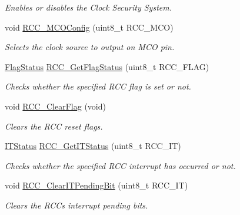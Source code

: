 \begin{DoxyCompactItemize}
\begin{DoxyCompactList}\small\item\em Enables or disables the Clock Security System. \end{DoxyCompactList}\item 
void \mbox{\hyperlink{group___r_c_c___exported___functions_ga8f62b86c6ca8ae6585ba1cec79431fe5}{R\+C\+C\+\_\+\+M\+C\+O\+Config}} (uint8\+\_\+t R\+C\+C\+\_\+\+M\+CO)
\begin{DoxyCompactList}\small\item\em Selects the clock source to output on M\+CO pin. \end{DoxyCompactList}\item 
\mbox{\hyperlink{group___exported__types_ga89136caac2e14c55151f527ac02daaff}{Flag\+Status}} \mbox{\hyperlink{group___r_c_c___exported___functions_ga2897bdc52f272031c44fb1f72205d295}{R\+C\+C\+\_\+\+Get\+Flag\+Status}} (uint8\+\_\+t R\+C\+C\+\_\+\+F\+L\+AG)
\begin{DoxyCompactList}\small\item\em Checks whether the specified R\+CC flag is set or not. \end{DoxyCompactList}\item 
void \mbox{\hyperlink{group___r_c_c___exported___functions_ga53f909dbb15a54124419084ebda97d72}{R\+C\+C\+\_\+\+Clear\+Flag}} (void)
\begin{DoxyCompactList}\small\item\em Clears the R\+CC reset flags. \end{DoxyCompactList}\item 
\mbox{\hyperlink{group___exported__types_gaacbd7ed539db0aacd973a0f6eca34074}{I\+T\+Status}} \mbox{\hyperlink{group___r_c_c___exported___functions_ga6126c99f398ee4be410ad76ae3aee18f}{R\+C\+C\+\_\+\+Get\+I\+T\+Status}} (uint8\+\_\+t R\+C\+C\+\_\+\+IT)
\begin{DoxyCompactList}\small\item\em Checks whether the specified R\+CC interrupt has occurred or not. \end{DoxyCompactList}\item 
void \mbox{\hyperlink{group___r_c_c___exported___functions_ga529842d165910f8f87e26115da36089b}{R\+C\+C\+\_\+\+Clear\+I\+T\+Pending\+Bit}} (uint8\+\_\+t R\+C\+C\+\_\+\+IT)
\begin{DoxyCompactList}\small\item\em Clears the R\+CC\textquotesingle{}s interrupt pending bits. \end{DoxyCompactList}\end{DoxyCompactItemize}



